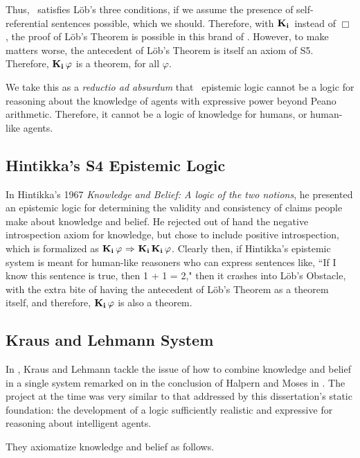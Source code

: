 Thus, \SFive\ satisfies L\"ob's three conditions, if we assume the presence of self-referential sentences possible, which we should. Therefore, with $\mathbf{K}_{\mathbf{i}}\,$ instead of $\Box$, the proof of L\"ob's Theorem is possible in this brand of \SFive. However, to make matters worse, the antecedent of L\"ob's Theorem is itself an axiom of S5. Therefore, $\mathbf{K}_{\mathbf{i}}\,\varphi$ is a theorem, for all $\varphi$.

We take this as a \emph{reductio ad absurdum} that \SFive\ epistemic logic cannot be a logic for reasoning about the knowledge of agents with expressive power beyond Peano arithmetic. Therefore, it cannot be a logic of knowledge for humans, or human-like agents.

\subsection{Hintikka's S4 Epistemic Logic}
\label{sec:hint_s4}
In Hintikka's 1967 \emph{Knowledge and Belief: A logic of the two notions}, he presented an epistemic logic for determining the validity and consistency of claims people make about knowledge and belief. He rejected out of hand the negative introspection axiom for knowledge, but chose to include positive introspection, which is formalized as $\mathbf{K}_{\mathbf{i}}\,\varphi{\ \Rightarrow \ }\mathbf{K}_{\mathbf{i}}\,\mathbf{K}_{\mathbf{i}}\,\varphi$. Clearly then, if Hintikka's epistemic system is meant for human-like reasoners who can express sentences like, ``If I know this sentence is true, then 1 + 1 = 2," then it crashes into L\"ob's Obstacle, with the extra bite of having the antecedent of L\"ob's Theorem as a theorem itself, and therefore, $\mathbf{K}_{\mathbf{i}}\,\varphi$ is also a theorem.

\subsection{Kraus and Lehmann System}
\label{sec:kl}

In \cite{KrausLehmann}, Kraus and Lehmann tackle the issue of how to combine knowledge and belief in a single system remarked on in the conclusion of Halpern and Moses in \cite{HalpernMoses}. The project at the time was very similar to that addressed by this dissertation's static foundation: the development of a logic sufficiently realistic and expressive for reasoning about intelligent agents. 

They axiomatize knowledge and belief as follows.

